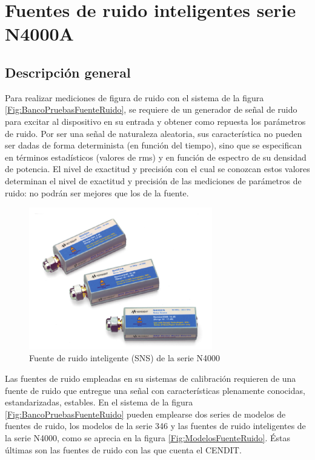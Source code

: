 \section{Fuentes de ruido inteligentes serie N4000A}
	\subsection{Descripción general}
	
	Para realizar mediciones de figura de ruido con el sistema de la figura \ref{Fig:BancoPruebasFuenteRuido}, se requiere de un generador de señal de ruido para excitar al dispositivo en su entrada y obtener como repuesta los parámetros de ruido. Por ser una señal de naturaleza aleatoria, sus característica no pueden ser dadas de forma determinista (en función del tiempo), sino que se especifican en términos estadísticos (valores de rms) y en función de espectro de su  densidad de potencia. El nivel de exactitud y precisión con el cual se conozcan estos valores determinan el nivel de exactitud y precisión de las mediciones de parámetros de ruido: no podrán ser mejores que los de la fuente.  
	
	\begin{figure}[h!]
		\centering
		\includegraphics[width=8cm]{Imagenes/FuenteRuidoSNS.pdf}
		\caption{Fuente de ruido inteligente (SNS) de la serie N4000}
		\label{Fig:FuenteRuidoSNS}
	\end{figure}
	
	Las fuentes de ruido empleadas en su sistemas de calibración requieren de una fuente de ruido que entregue una señal con características plenamente conocidas, estandarizadas, estables. En el sistema de la figura \ref{Fig:BancoPruebasFuenteRuido} pueden emplearse dos series de modelos de fuentes de ruido, los modelos de la serie 346 y las fuentes de ruido inteligentes de la serie N4000, como se aprecia en la figura \ref{Fig:ModelosFuenteRuido}. Éstas últimas son las fuentes de ruido con las que cuenta el CENDIT.
	
